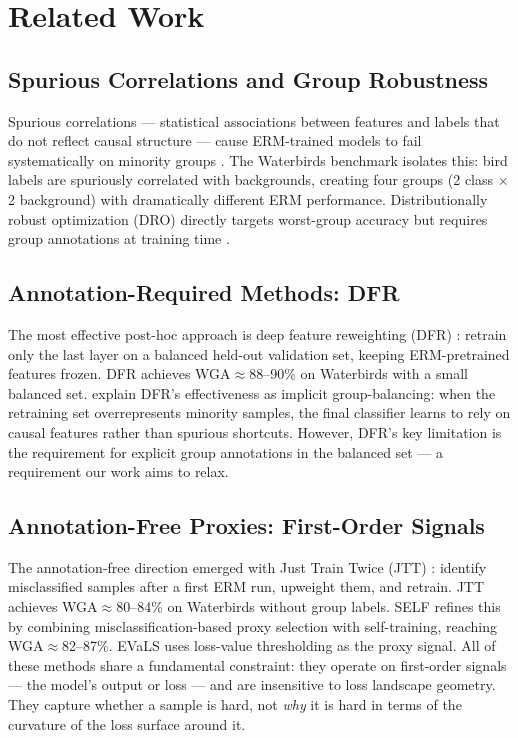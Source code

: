 \section{Related Work}
\label{sec:related}

\subsection{Spurious Correlations and Group Robustness}

Spurious correlations --- statistical associations between features and labels that do not reflect causal structure --- cause ERM-trained models to fail systematically on minority groups \cite{sagawa2019distributionally}. The Waterbirds benchmark \cite{sagawa2019distributionally} isolates this: bird labels are spuriously correlated with backgrounds, creating four groups (2 class $\times$ 2 background) with dramatically different ERM performance. Distributionally robust optimization (DRO) directly targets worst-group accuracy but requires group annotations at training time \cite{sagawa2019distributionally}.

\subsection{Annotation-Required Methods: DFR}

The most effective post-hoc approach is deep feature reweighting (DFR) \cite{kirichenko2022last}: retrain only the last layer on a balanced held-out validation set, keeping ERM-pretrained features frozen. DFR achieves WGA$\approx$88--90\% on Waterbirds with a small balanced set. \cite{hill2025unreasonable} explain DFR's effectiveness as implicit group-balancing: when the retraining set overrepresents minority samples, the final classifier learns to rely on causal features rather than spurious shortcuts. However, DFR's key limitation is the requirement for explicit group annotations in the balanced set --- a requirement our work aims to relax.

\subsection{Annotation-Free Proxies: First-Order Signals}

The annotation-free direction emerged with Just Train Twice (JTT) \cite{liu2021just}: identify misclassified samples after a first ERM run, upweight them, and retrain. JTT achieves WGA$\approx$80--84\% on Waterbirds without group labels. SELF \cite{labonte2023towards} refines this by combining misclassification-based proxy selection with self-training, reaching WGA$\approx$82--87\%. EVaLS uses loss-value thresholding as the proxy signal. All of these methods share a fundamental constraint: they operate on first-order signals --- the model's output or loss --- and are insensitive to loss landscape geometry. They capture whether a sample is hard, not \emph{why} it is hard in terms of the curvature of the loss surface around it.

